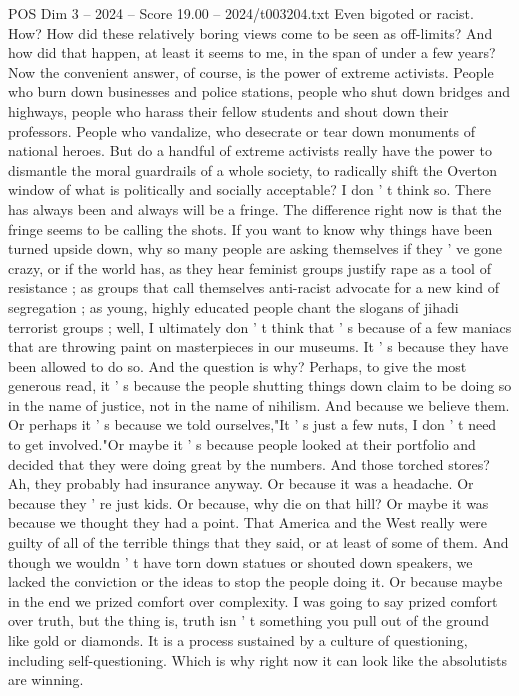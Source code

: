 \begin{textsample}{POS Dim 3 – 2024 – Score 19.00 – 2024/t003204.txt}
Even bigoted or racist.
How?
How did these relatively boring views come to be seen as off-limits?
And how did that happen, at least it seems to me, in the span of under a few years?
Now the convenient answer, of course, is the power of extreme activists.
People who burn down businesses and police stations, people who shut down bridges and highways, people who harass their fellow students and shout down their professors.
People who vandalize, who desecrate or tear down monuments of national heroes.
But do a handful of extreme activists really have the power to dismantle the moral guardrails of a whole society, to radically shift the Overton window of what is politically and socially acceptable?
I don ' t think so.
There has always been and always will be a fringe.
The difference right now is that the fringe seems to be calling the shots.
If you want to know why things have been turned upside down, why so many people are asking themselves if they ' ve gone crazy, or if the world has, as they hear feminist groups justify rape as a tool of resistance ; as groups that call themselves anti-racist advocate for a new kind of segregation ; as young, highly educated people chant the slogans of jihadi terrorist groups ; well, I ultimately don ' t think that ' s because of a few maniacs that are throwing paint on masterpieces in our museums.
It ' s because they have been allowed to do so.
And the question is why?
Perhaps, to give the most generous read, it ' s because the people shutting things down claim to be doing so in the name of justice, not in the name of nihilism.
And because we believe them.
Or perhaps it ' s because we told ourselves,"It ' s just a few nuts, I don ' t need to get involved."Or maybe it ' s because people looked at their portfolio and decided that they were doing great by the numbers.
And those torched stores?
Ah, they probably had insurance anyway.
Or because it was a headache.
Or because they ' re just kids.
Or because, why die on that hill?
Or maybe it was because we thought they had a point.
That America and the West really were guilty of all of the terrible things that they said, or at least of some of them.
And though we wouldn ' t have torn down statues or shouted down speakers, we lacked the conviction or the ideas to stop the people doing it.
Or because maybe in the end we prized comfort over complexity.
I was going to say prized comfort over truth, but the thing is, truth isn ' t something you pull out of the ground like gold or diamonds.
It is a process sustained by a culture of questioning, including self-questioning.
Which is why right now it can look like the absolutists are winning.

\end{textsample}

